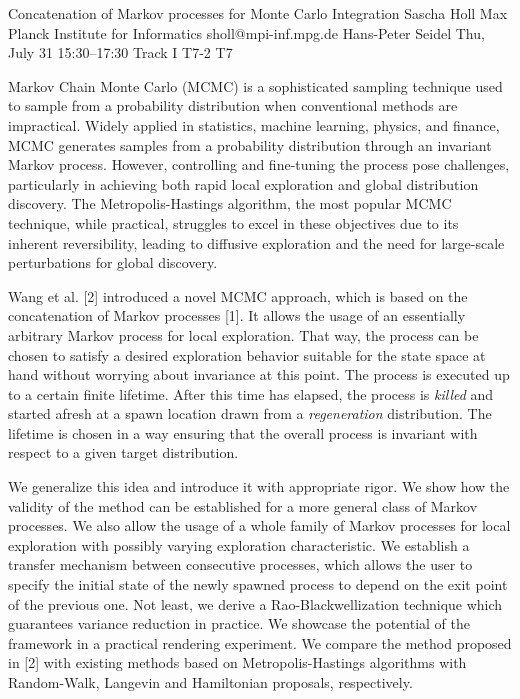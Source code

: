 \begin{talk}
  {Concatenation of Markov processes for Monte Carlo Integration}%
  {Sascha Holl}%
  {Max Planck Institute for Informatics}%
  {sholl@mpi-inf.mpg.de}%
  {Hans-Peter Seidel}%
  {}%
  {Thu, July 31 15:30–17:30 Track I}%
  {T7-2}%
  {T7}%
  
				

Markov Chain Monte Carlo (MCMC) is a sophisticated sampling technique used to sample from a probability distribution when conventional methods are impractical. Widely applied in statistics, machine learning, physics, and finance, MCMC generates samples from a probability distribution through an invariant Markov process. However, controlling and fine-tuning the process pose challenges, particularly in achieving both rapid local exploration and global distribution discovery. The Metropolis-Hastings algorithm, the most popular MCMC technique, while practical, struggles to excel in these objectives due to its inherent reversibility, leading to diffusive exploration and the need for large-scale perturbations for global discovery.

Wang et al. [2] introduced a novel MCMC approach, which is based on the concatenation of Markov processes [1]. It allows the usage of an essentially arbitrary Markov process for local exploration. That way, the process can be chosen to satisfy a desired exploration behavior suitable for the state space at hand without worrying about invariance at this point. The process is executed up to a certain finite lifetime. After this time has elapsed, the process is \textit{killed} and started afresh at a spawn location drawn from a \textit{regeneration} distribution. The lifetime is chosen in a way ensuring that the overall process is invariant with respect to a given target distribution.

We generalize this idea and introduce it with appropriate rigor. We show how the validity of the method can be established for a more general class of Markov processes. We also allow the usage of a whole family of Markov processes for local exploration with possibly varying exploration characteristic. We establish a transfer mechanism between consecutive processes, which allows the user to specify the initial state of the newly spawned process to depend on the exit point of the previous one. Not least, we derive a Rao-Blackwellization technique which guarantees variance reduction in practice.
We showcase the potential of the framework in a practical rendering experiment. We compare the method proposed in [2] with existing methods based on Metropolis-Hastings algorithms with Random-Walk, Langevin and Hamiltonian proposals, respectively.


\end{talk}
